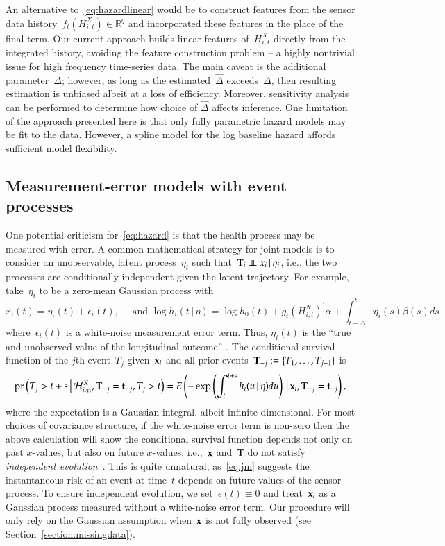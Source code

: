 \documentclass[12pt]{amsart}
\def\pr{\mathop{\text{pr}}\nolimits}
\def\pr{\mathop{\text{pr}}\nolimits}
\def\indep{\mathrel{\rlap{$\perp$}\kern1.6pt\mathord{\perp}}}
\def\H{\mathcal{H}}
\def\given{\, | \,}
\def\Given{\, \big | \,}
\def\bft{{\bf t}}
\def\bfx{{\bf x}}
\def\bfT{{\bf T}}
\begin{document}
An alternative to~\eqref{eq:hazardlinear} would be to construct features from the sensor data history~$f_t ( H_{i,t}^{X}) \in \mathbb{R}^q$ and incorporated these features in the place of the final term. Our current approach builds linear features of~$H_{i,t}^X$ directly from the integrated history, avoiding the feature construction problem -- a highly nontrivial issue for high frequency time-series data.  The main caveat is the additional parameter~$\Delta$; however, as long as the estimated~$\hat \Delta$ exceeds~$\Delta$, then resulting estimation is unbiased albeit at a loss of efficiency.  Moreover, sensitivity analysis can be performed to determine how choice of $\hat \Delta$ affects inference.  One limitation of the approach presented here is that only fully parametric hazard models may be fit to the data. However, a spline model for the log baseline hazard affords sufficient model flexibility.

\subsection{Measurement-error models with event processes}
\label{section:memproblems}

One potential criticism for~\eqref{eq:hazard} is that the health process may be measured with error. A common mathematical strategy for joint models is to consider an unobservable, latent process~$\eta_i$ such that~$\bfT_i \indep x_i \given \eta_i$, i.e., the two processes are conditionally independent given the latent trajectory. For example, take~$\eta_i$ to be a zero-mean Gaussian process with
\begin{equation}\label{eq:jm}
x_i(t) = \eta_i (t) + \epsilon_i (t),\quad \text{ and } \log h_i (t
\given \eta ) = \log h_0 (t) + g_t \left( H_{i,t}^N \right)^{\prime}
\alpha + \int_{t-\Delta}^t \eta_i (s) \beta (s) ds
\end{equation}
where~$\epsilon_i(t)$ is a white-noise measurement error term. Thus, $\eta_i (t)$ is the ``true and unobserved value of the longitudinal outcome'' \citep[Sec. 2.1, pp.3]{Rizopoulos2010}. The conditional survival function of the $j$th event~$T_j$ given~$\bfx_i$ and all prior events~$\bfT_{-j} := \{ T_1, \ldots, T_{j-1} \}$ is
\[
\pr \left ( T_j > t+s \Given \H_{i,\tau_i}^X, \bfT_{-j} = \bft_{-j}, T_j > t \right) = E \left( - \exp \left( \int_{t}^{t+s} h_i (u \given \eta ) du \right) \Given \bfx_i, \bfT_{-j} = \bft_{-j} \right),
\]
where the expectation is a Gaussian integral, albeit infinite-dimensional.  For most choices of covariance structure, if the white-noise error term is non-zero then the above calculation will show the conditional survival function depends not only on past $x$-values, but also on future $x$-values, i.e.,~$\bfx$ and~$\bfT$ do not satisfy \emph{independent evolution}~\citep{DempseyPMCC2}. This is quite unnatural, as~\eqref{eq:jm} suggests the instantaneous risk of an event at time~$t$ depends on future values of the sensor process. To ensure independent evolution, we set~$\epsilon (t) \equiv 0$ and treat~$\bfx_i$ as a Gaussian process measured without a white-noise error term.
Our procedure will only rely on the Gaussian assumption when~$\bfx$ is not fully observed (see Section~\ref{section:missingdata}).
\end{document}
